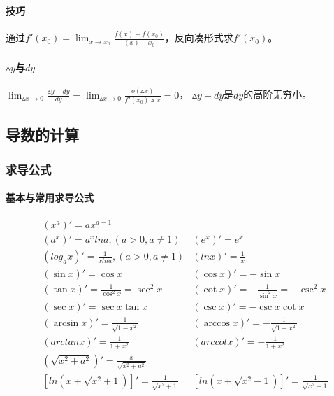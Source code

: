 \documentclass[
12pt, %
a4paper, 
oneside, %
headinclude,footinclude, %
]{scrartcl}
\begin{document}
\paragraph{技巧}
通过$ f'(x_0) = \lim_{x \to x_0}\frac{f(x)-f(x_0)}{(x) - x_0} $，反向凑形式求$ f'(x_0) $。
\paragraph{$ \vartriangle y $与$ dy $}
$ \lim_{\vartriangle x \to 0} \frac{\vartriangle y - dy}{dy} = \lim_{\vartriangle x \to 0} \frac{o(\vartriangle x)}{f'(x_0)\vartriangle x} = 0 $，
$ \vartriangle y - dy $是$ dy $的高阶无穷小。
\subsection{导数的计算}
\subsubsection{求导公式}
\paragraph{基本与常用求导公式}
\begin{align*}
&(x^a)' = ax^{a - 1} \\
&(a^x)' = a^x lna,(a > 0, a \neq 1) &(e^x)' = e^x \\
&(log_a x)' = \frac{1}{x lna},(a > 0, a \neq 1) &(ln x)' = \frac{1}{x}\\
&(\sin x)' = \cos x &(\cos x)' = -\sin x \\
&(\tan x)' = \frac{1}{\cos^2 x} = \sec^2 x &(\cot x)' = -\frac{1}{\sin^2 x} = -\csc^2 x \\
&(\sec x)' = \sec x \tan x &(\csc x)' = -\csc x \cot x \\
&(\arcsin x)' = \frac{1}{\sqrt{1 - x^2}} &(\arccos x)' = -\frac{1}{\sqrt{1 - x^2}} \\
&(arctan x)' = \frac{1}{1 + x^2} &(arccot x)' = -\frac{1}{1 + x^2} \\
&(\sqrt{x^2 + a^2})' = \frac{x}{\sqrt{x^2 + a^2}} \\
&[ln(x + \sqrt{x^2 + 1})]' = \frac{1}{\sqrt{x^2 + 1}} &[ln(x + \sqrt{x^2 - 1})]' = \frac{1}{\sqrt{x^2 - 1}} 
\end{align*}
\end{document}
